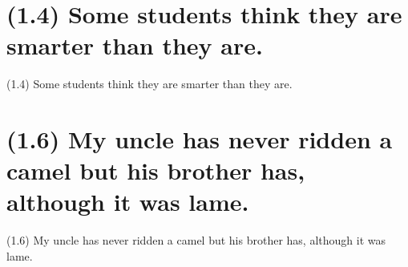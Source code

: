 \documentclass{article}
\begin{document}
\section*{(1.4) Some students think they are smarter than they are.}

\bigbreak
\begin{enumerate*}
\item[(1.4)] Some students think they are smarter than they are.
\end{enumerate*}
\bigbreak

\clearpage

%
%

\section*{(1.6) My uncle has never ridden a camel but his brother has, although it was lame.}

\bigbreak
\begin{enumerate*}
\item[(1.6)] My uncle has never ridden a camel but his brother has, although it was lame.
\end{enumerate*}
\bigbreak
\end{document}
